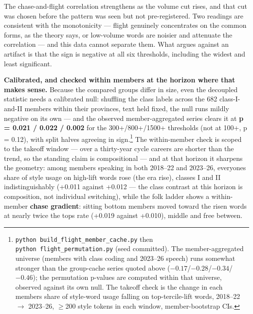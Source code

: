 The chase-and-flight correlation strengthens as the volume cut rises, and that
cut was chosen before the pattern was seen but not pre-registered. Two readings
are consistent with the monotonicity --- flight genuinely concentrates on the
common forms, as the theory says, or low-volume words are noisier and
attenuate the correlation --- and this data cannot separate them. What argues
against an artifact is that the sign is negative at all six thresholds,
including the widest and least significant.

\textbf{Calibrated, and checked within members at the horizon where that makes
sense.} Because the compared groups differ in size, even the decoupled
statistic needs a calibrated null: shuffling the class labels across the
682 class-I-and-II members within their provinces, text held fixed, the
null runs mildly negative on its own --- and the observed member-aggregated
series clears it at \textbf{p = 0.021 / 0.022 / 0.002} for the 300+/800+/1500+
thresholds (not at 100+, p = 0.12), with split halves agreeing in
sign.\footnote{\texttt{python\ build\_\allowbreak{}flight\_\allowbreak{}member\_\allowbreak{}cache.\allowbreak{}py} then
  \texttt{python\ flight\_\allowbreak{}permutation.\allowbreak{}py} (seed committed). The member-aggregated
  universe (members with class coding and 2023--26 speech) runs somewhat
  stronger than the group-cache series quoted above (\(-0.17\)/\(-0.28\)/\(-0.34\)/
  \(-0.46\)); the permutation p-values are computed within that universe,
  observed against its own null. The takeoff check is the change in each
  member\textquotesingle s share of style-word usage falling on top-tercile-lift words,
  2018--22 \(\rightarrow\) 2023--26, \(\geq\)200 style tokens in each window, member-bootstrap
  CIs.} The within-member check is scoped to the takeoff window ---
over a thirty-year cycle careers are shorter than the trend, so the
standing claim is compositional --- and at that horizon it sharpens the
geometry: among members speaking in both 2018--22 and 2023--26, everyone\textquotesingle s
share of style usage on high-lift words rose (the era rise), classes I and
II indistinguishably (+0.011 against +0.012 --- the class contrast at this
horizon is composition, not individual switching), while the folk ladder
shows a within-member \textbf{chase gradient}: sitting bottom members moved
toward the risen words at nearly twice the top\textquotesingle s rate (+0.019 against
+0.010), middle and free between.

